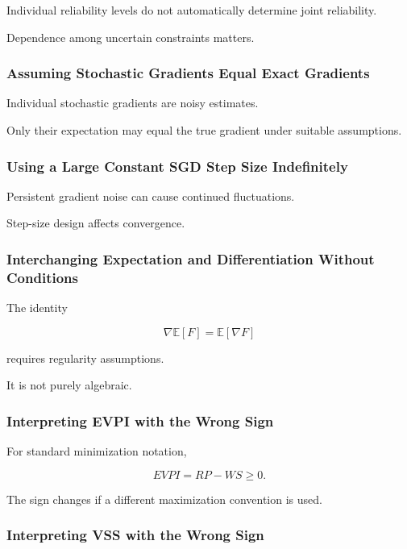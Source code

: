 Individual reliability levels do not automatically determine joint
reliability.

Dependence among uncertain constraints matters.

\subsubsection{Assuming Stochastic Gradients Equal Exact Gradients}

Individual stochastic gradients are noisy estimates.

Only their expectation may equal the true gradient under suitable
assumptions.

\subsubsection{Using a Large Constant SGD Step Size Indefinitely}

Persistent gradient noise can cause continued fluctuations.

Step-size design affects convergence.

\subsubsection{Interchanging Expectation and Differentiation Without Conditions}

The identity

\[
\nabla
\mathbb{E}[F]
=
\mathbb{E}[\nabla F]
\]

requires regularity assumptions.

It is not purely algebraic.

\subsubsection{Interpreting EVPI with the Wrong Sign}

For standard minimization notation,

\[
\boxed{
EVPI=RP-WS\geq0.
}
\]

The sign changes if a different maximization convention is used.

\subsubsection{Interpreting VSS with the Wrong Sign}

